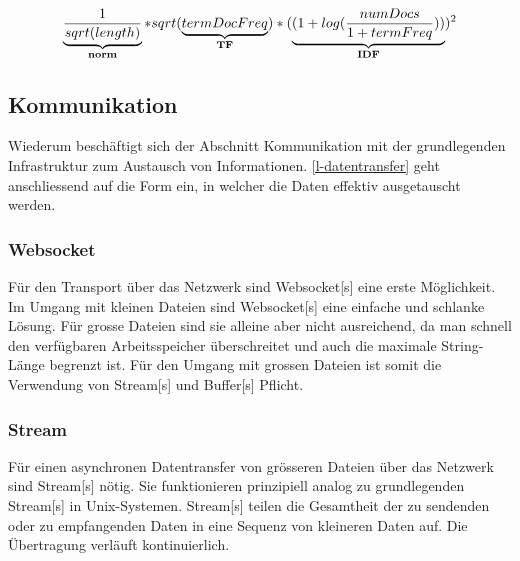 \begin{itemize}
    \begin{equation}\label{lucene}
    \underbrace{ \frac{1}{sqrt(length)} }_\text{\textbf{norm}} * sqrt(\underbrace{termDocFreq}_\text{\textbf{TF}}) *  (\underbrace{(1 +log( \frac{numDocs}{1 + termFreq}))}_\text{\textbf{IDF}})^{2}
    \end{equation}
\end{itemize}


\subsection{Kommunikation}


Wiederum beschäftigt sich der Abschnitt Kommunikation mit der grundlegenden Infrastruktur zum Austausch von Informationen. \autoref{l-datentransfer} geht anschliessend auf die Form ein, in welcher die Daten effektiv ausgetauscht werden.



\subsubsection{Websocket}


Für den Transport über das Netzwerk sind \gls{Websocket}[s] eine erste Möglichkeit. Im Umgang mit kleinen Dateien sind \gls{Websocket}[s] eine einfache und schlanke Lösung. Für grosse Dateien sind sie alleine aber nicht ausreichend, da man schnell den verfügbaren Arbeitsspeicher überschreitet und auch die maximale String-Länge begrenzt ist. Für den Umgang mit grossen Dateien ist somit die Verwendung von \gls{Stream}[s] und \gls{Buffer}[s] Pflicht. 



\subsubsection{Stream}


Für einen asynchronen Datentransfer von grösseren Dateien über das Netzwerk sind \gls{Stream}[s] nötig. Sie funktionieren prinzipiell analog zu grundlegenden \gls{Stream}[s] in Unix-Systemen. \gls{Stream}[s] teilen die Gesamtheit der zu sendenden oder zu empfangenden Daten in eine Sequenz von kleineren Daten auf. Die Übertragung verläuft kontinuierlich.

